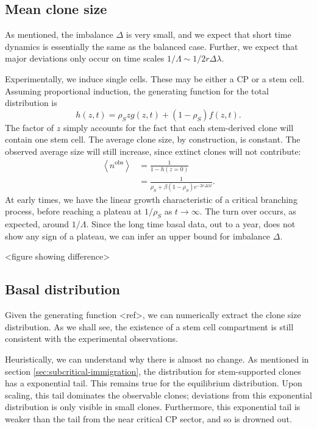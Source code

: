 \documentclass[10pt,UKenglish]{article}
\begin{document}
\subsection{Mean clone size}

As mentioned, the imbalance $\Delta$ is very small, and we expect that short time dynamics is essentially the same as the balanced case. Further, we expect that major deviations only occur on time scales $1/\Lambda \sim 1/2 r \Delta \lambda$.

Experimentally, we induce single cells. These may be either a CP or a stem cell. Assuming proportional induction, the generating function for the total distribution is $$h(z,t) = \rho_S z g(z,t) + (1-\rho_S) f(z,t).$$ The factor of $z$ simply accounts for the fact that each stem-derived clone will contain one stem cell. The average clone size, by construction, is constant. The observed average size will still increase, since extinct clones will not contribute: 
\begin{align*}
\left\langle n^\textrm{obs} \right\rangle &= \frac{1}{1 - h(z=0)} \\
  &= \frac{1}{\rho_S + \beta (1-\rho_S) e^{-2 r \Delta \lambda t}}.
\end{align*}
At early times, we have the linear growth characteristic of a critical branching process, before reaching a plateau at $1/\rho_S$ as $t\rightarrow\infty$. The turn over occurs, as expected, around $1/\Lambda$. Since the long time basal data, out to a year, does not show any sign of a plateau, we can infer an upper bound for imbalance $\Delta$.

<figure showing difference>

\subsection{Basal distribution}

Given the generating function <ref>, we can numerically extract the clone size distribution. As we shall see, the existence of a stem cell compartment is still consistent with the experimental observations.

Heuristically, we can understand why there is almost no change. As mentioned in section \ref{sec:subcritical-immigration}, the distribution for stem-supported clones has a exponential tail. This remains true for the equilibrium distribution. Upon scaling, this tail dominates the observable clones; deviations from this exponential distribution is only visible in small clones. Furthermore, this exponential tail is weaker than the tail from the near critical CP sector, and so is drowned out.
\end{document}
